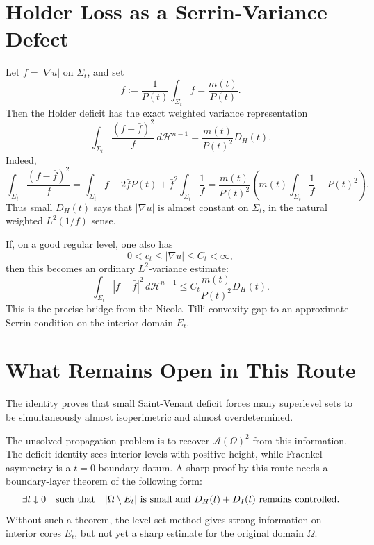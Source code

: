 \documentclass[11pt]{article}
\begin{document}
\section{Holder Loss as a Serrin-Variance Defect}

Let \(f=|\nabla u|\) on \(\Sigma_t\), and set
\[
\bar f:=\frac1{P(t)}\int_{\Sigma_t}f
=
\frac{m(t)}{P(t)}.
\]
Then the Holder deficit has the exact weighted variance representation
\[
\boxed{
\int_{\Sigma_t}
\frac{(f-\bar f)^2}{f}\,d\mathcal H^{n-1}
=
\frac{m(t)}{P(t)^2}D_H(t).
}
\]
Indeed,
\[
\int_{\Sigma_t}\frac{(f-\bar f)^2}{f}
=
\int_{\Sigma_t}f
-2\bar f P(t)
+\bar f^2\int_{\Sigma_t}\frac1f
=
\frac{m(t)}{P(t)^2}
\left(
m(t)\int_{\Sigma_t}\frac1f-P(t)^2
\right).
\]
Thus small \(D_H(t)\) says that \(|\nabla u|\) is almost constant on
\(\Sigma_t\), in the natural weighted \(L^2(1/f)\) sense.

If, on a good regular level, one also has
\[
0<c_t\le |\nabla u|\le C_t<\infty,
\]
then this becomes an ordinary \(L^2\)-variance estimate:
\[
\int_{\Sigma_t}|f-\bar f|^2\,d\mathcal H^{n-1}
\le
C_t\frac{m(t)}{P(t)^2}D_H(t).
\]
This is the precise bridge from the Nicola--Tilli convexity gap to an
approximate Serrin condition on the interior domain \(E_t\).

\section{What Remains Open in This Route}

The identity proves that small Saint-Venant deficit forces many superlevel sets
to be simultaneously almost isoperimetric and almost overdetermined.

The unsolved propagation problem is to recover \(\mathcal A(\Omega)^2\) from
this information. The deficit identity sees interior levels with positive
height, while Fraenkel asymmetry is a \(t=0\) boundary datum. A sharp proof by
this route needs a boundary-layer theorem of the following form:
\[
\exists t\downarrow0
\quad\hbox{such that}\quad
|\Omega\setminus E_t|
\hbox{ is small and }
D_H(t)+D_I(t)
\hbox{ remains controlled.}
\]
Without such a theorem, the level-set method gives strong information on
interior cores \(E_t\), but not yet a sharp estimate for the original domain
\(\Omega\).
\end{document}
